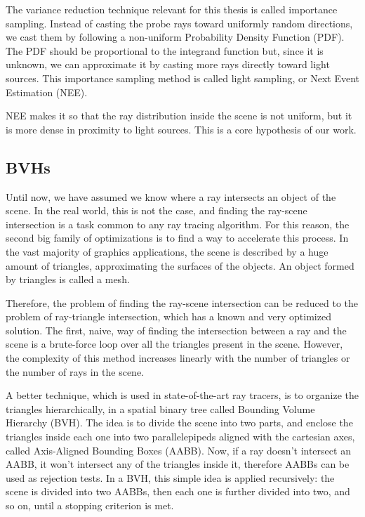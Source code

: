 \documentclass[11pt,a4paper,twocolumn]{article}
\begin{document}
The variance reduction technique relevant for this thesis is called importance sampling. Instead of casting the probe rays toward uniformly random directions, we cast them by following a non-uniform Probability Density Function (PDF). The PDF should be proportional to the integrand function but, since it is unknown, we can approximate it by casting more rays directly toward light sources. This importance sampling method is called light sampling, or Next Event Estimation (NEE).

NEE makes it so that the ray distribution inside the scene is not uniform, but it is more dense in proximity to light sources. This is a core hypothesis of our work.

\subsection{BVHs}
Until now, we have assumed we know where a ray intersects an object of the scene. In the real world, this is not the case, and finding the ray-scene intersection is a task common to any ray tracing algorithm. For this reason, the second big family of optimizations is to find a way to accelerate this process. In the vast majority of graphics applications, the scene is described by a huge amount of triangles, approximating the surfaces of the objects. An object formed by triangles is called a mesh.

Therefore, the problem of finding the ray-scene intersection can be reduced to the problem of ray-triangle intersection, which has a known and very optimized solution. The first, naive, way of finding the intersection between a ray and the scene is a brute-force loop over all the triangles present in the scene. However, the complexity of this method increases linearly with the number of triangles or the number of rays in the scene. 

A better technique, which is used in state-of-the-art ray tracers, is to organize the triangles hierarchically, in a spatial binary tree called Bounding Volume Hierarchy (BVH). The idea is to divide the scene into two parts, and enclose the triangles inside each one into two parallelepipeds aligned with the cartesian axes, called Axis-Aligned Bounding Boxes (AABB). Now, if a ray doesn't intersect an AABB, it won't intersect any of the triangles inside it, therefore AABBs can be used as rejection tests. In a BVH, this simple idea is applied recursively: the scene is divided into two AABBs, then each one is further divided into two, and so on, until a stopping criterion is met. 
\end{document}
